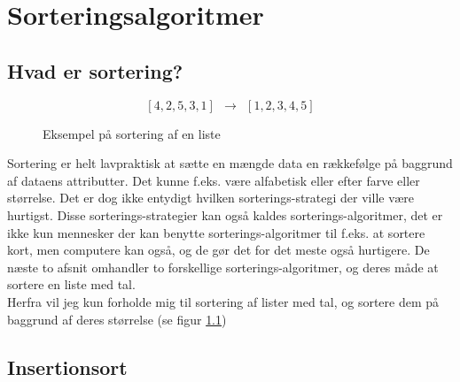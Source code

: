 \chapter{Sorteringsalgoritmer}
\label{ch:Sorteringsalgoritmer}

\section{Hvad er sortering?}
\label{sec:Hvad er sortering?}

\begin{figure}
	\begin{center}
		$$[4,2,5,3,1] \:\:\longrightarrow\:\: [1,2,3,4,5]$$
	\end{center}
	\caption{Eksempel på sortering af en liste}
	\label{fig:Eksempel på sortering af en liste}
\end{figure}


Sortering er helt lavpraktisk at sætte en mængde data en rækkefølge på baggrund af dataens attributter. Det kunne f.eks. være alfabetisk eller efter farve eller størrelse. Det er dog ikke entydigt hvilken sorterings-strategi der ville være hurtigst. Disse sorterings-strategier kan også kaldes sorterings-algoritmer, det er ikke kun mennesker der kan benytte sorterings-algoritmer til f.eks. at sortere kort, men computere kan også, og de gør det for det meste også hurtigere. De næste to afsnit omhandler to forskellige sorterings-algoritmer, og deres måde at sortere en liste med tal.\\


Herfra vil jeg kun forholde mig til sortering af lister med tal, og sortere dem på baggrund af deres størrelse (se figur \ref{fig:Eksempel på sortering af en liste})


\section{Insertionsort}
\label{sec:Insertionsort}


